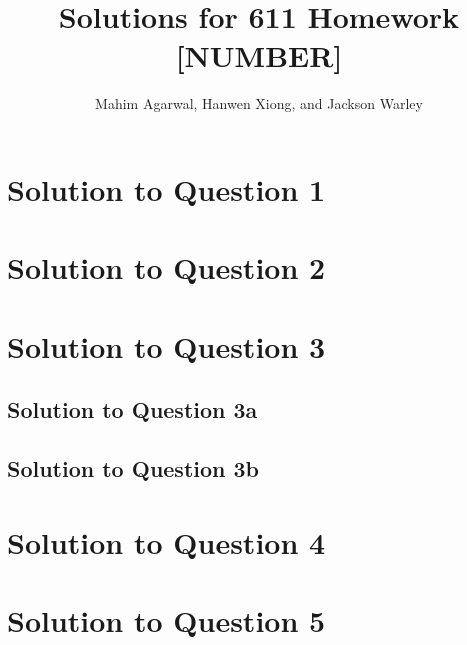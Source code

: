 \documentclass[11pt,handout]{article}
\title{Solutions for 611 Homework [NUMBER]}
\author{Mahim Agarwal, Hanwen Xiong, and Jackson Warley}
\begin{document}
\maketitle

\section{Solution to Question 1}



\section{Solution to Question 2}



\section{Solution to Question 3}

\subsection{Solution to Question 3a}

\subsection{Solution to Question 3b}

\section{Solution to Question 4}

\section{Solution to Question 5}
\end{document}
